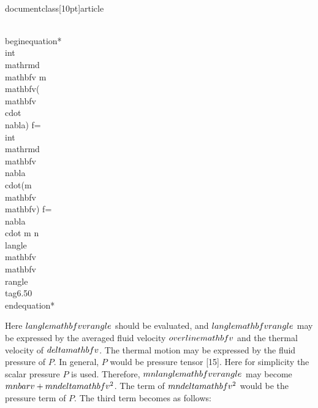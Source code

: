 \\documentclass[10pt]{article}
\begin{document}
{{{{\\begin{equation*}
\\int \\mathrm{d} \\mathbf{v} m \\mathbf{v}(\\mathbf{v} \\cdot \\nabla) f=\\int \\mathrm{d} \\mathbf{v} \\nabla \\cdot(m \\mathbf{v} \\mathbf{v}) f=\\nabla \\cdot m n\\langle\\mathbf{v} \\mathbf{v}\\rangle \\tag{6.50}
\\end{equation*}


Here $\\langle\\mathbf{v v}\\rangle$ should be evaluated, and $\\langle\\mathbf{v}\\rangle$ may be expressed by the averaged fluid velocity $\\overline{\\mathbf{v}}$ and the thermal velocity of $\\delta \\mathbf{v}$. The thermal motion may be expressed by the fluid pressure of $P$. In general, $P$ would be pressure tensor [15]. Here for simplicity the scalar pressure $P$ is used. Therefore, $m n\\langle\\mathbf{v v}\\rangle$ may become $m n \\bar{v}+m n \\delta \\mathbf{v}^{2}$. The term of $m n \\delta \\mathbf{v}^{2}$ would be the pressure term of $P$. The third term becomes as follows:


}}}}
\end{document}
